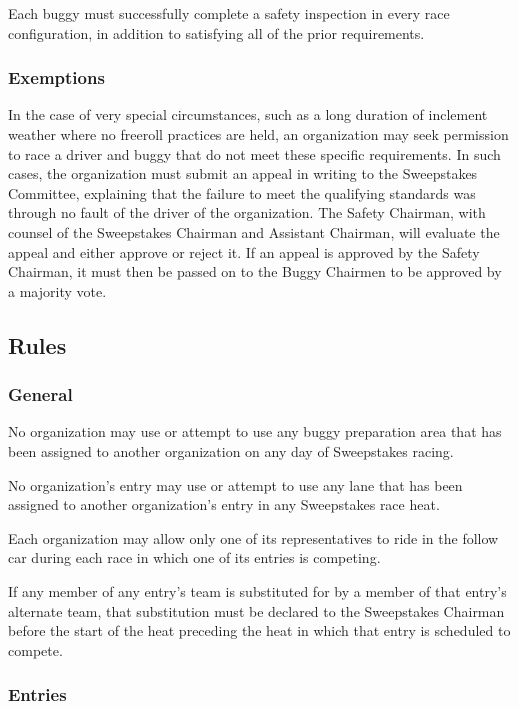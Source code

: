 	Each buggy must successfully complete a safety inspection in every race configuration, in addition to satisfying all of the prior requirements.

\subsubsection{Exemptions}

	In the case of very special circumstances, such as a long duration of inclement weather where no freeroll practices are held, an organization may seek permission to race a driver and buggy that do not meet these specific requirements. In such cases, the organization must submit an appeal in writing to the Sweepstakes Committee, explaining that the failure to meet the qualifying standards was through no fault of the driver of the organization. The Safety Chairman, with counsel of the Sweepstakes Chairman and Assistant Chairman, will evaluate the appeal and either approve or reject it. If an appeal is approved by the Safety Chairman, it must then be passed on to the Buggy Chairmen to be approved by a majority vote.

\subsection{Rules}

\subsubsection{General}

	No organization may use or attempt to use any buggy preparation area that has been assigned to another organization on any day of Sweepstakes racing.

	No organization's entry may use or attempt to use any lane that has been assigned to another organization's entry in any Sweepstakes race heat.

	Each organization may allow only one of its representatives to ride in the follow car during each race in which one of its entries is competing.

	If any member of any entry's team is substituted for by a member of that entry's alternate team, that substitution must be declared to the Sweepstakes Chairman before the start of the heat preceding the heat in which that entry is scheduled to compete.

\subsubsection{Entries}

